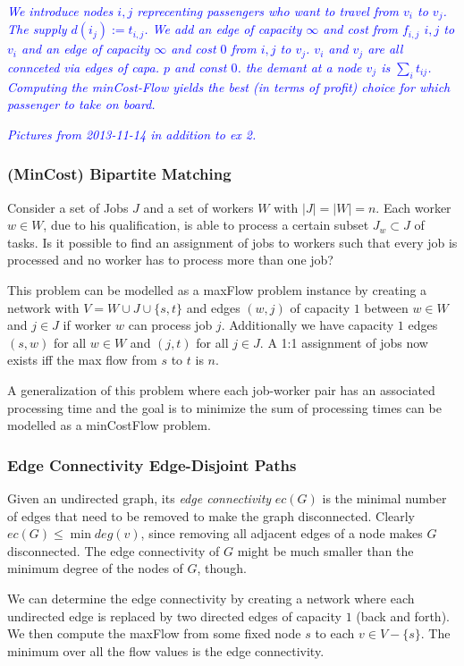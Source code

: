 \documentclass{article}
\begin{document}
\textcolor{blue}{\emph{We introduce nodes $i,j$ reprecenting passengers who want to travel from $v_i$ to $v_j$. The supply $d(i_j):=t_{i,j}$. We add an edge of capacity $\infty$ and  cost from $f_{i,j}$ $i,j$ to $v_i$ and an edge of capacity $\infty$ and cost $0$ from $i,j$ to $v_j$. $v_i$ and $v_j$ are all connceted via edges of capa. $p$ and const $0$. the demant at a node $v_j$ is $\sum_i{t_{ij}}$. Computing the minCost-Flow yields the best (in terms of profit) choice for which passenger to take on board.}}

\textcolor{blue}{\emph{Pictures from 2013-11-14 in addition to ex 2.}}

\subsubsection{(MinCost) Bipartite Matching}
Consider a set of Jobs $J$ and a set of workers $W$ with $|J|=|W|=n$. Each worker $w\in W$, due to his qualification, is able to process a certain subset $J_w\subset J$ of tasks. Is it possible to find an assignment of jobs to workers such that every job is processed and no worker has to process more than one job?

This problem can be modelled as a maxFlow problem instance by creating a network with $V=W\cup J\cup\{s,t\}$ and edges $(w,j)$ of capacity $1$ between $w\in W$ and $j\in J$ if worker $w$ can process job $j$. Additionally we have capacity $1$ edges $(s,w)$ for all $w\in W$ and $(j,t)$ for all $j\in J$. A 1:1 assignment of jobs now exists iff the max flow from $s$ to $t$ is $n$.

A generalization of this problem where each job-worker pair has an associated processing time and the goal is to minimize the sum of processing times can be modelled as a minCostFlow problem.

\subsubsection{Edge Connectivity Edge-Disjoint Paths}
Given an undirected graph, its \emph{edge connectivity} $ec(G)$ is the minimal number of edges that need to be removed to make the graph disconnected. Clearly $ec(G)\leq \min deg(v)$, since removing all adjacent edges of a node makes $G$ disconnected. The edge connectivity of $G$ might be much smaller than the minimum degree of the nodes of $G$, though.

We can determine the edge connectivity by creating a network where each undirected edge is replaced by two directed edges of capacity $1$ (back and forth). We then compute the maxFlow from some fixed node $s$ to each $v\in V-\{s\}$. The minimum over all the flow values is the edge connectivity.
\end{document}
